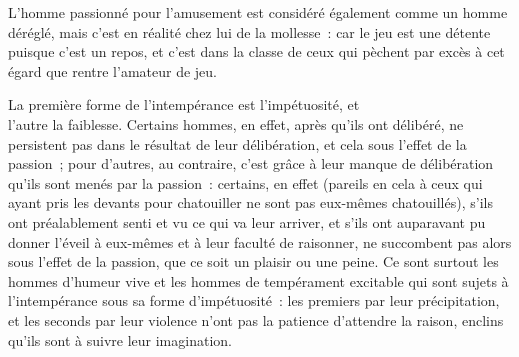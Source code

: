 \documentclass[french,twoside]{book} %
\begin{document}
L’homme passionné pour l’amusement est considéré également comme un homme déréglé, mais c’est en réalité chez lui de la mollesse : car le jeu est une détente puisque c’est un repos, et c’est dans la classe de ceux qui pèchent par excès à cet égard que rentre l’amateur de jeu.\par
La première forme de l’intempérance est l’impétuosité, et \\
l’autre la faiblesse. Certains hommes, en effet, après qu’ils ont délibéré, ne persistent pas dans le résultat de leur délibération, et cela sous l’effet de la passion ; pour d’autres, au contraire, c’est grâce à leur manque de délibération qu’ils sont menés par la passion : certains, en effet (pareils en cela à ceux qui ayant pris les devants pour chatouiller ne sont pas eux-mêmes chatouillés), s’ils ont préalablement senti et vu ce qui va leur arriver, et s’ils ont auparavant pu donner l’éveil à eux-mêmes et à leur faculté de raisonner, ne succombent pas alors \\
sous l’effet de la passion, que ce soit un plaisir ou une peine. Ce sont surtout les hommes d’humeur vive et les hommes de tempérament excitable qui sont sujets à l’intempérance sous sa forme d’impétuosité : les premiers par leur précipitation, et les seconds par leur violence n’ont pas la patience d’attendre la raison, enclins qu’ils sont à suivre leur imagination.
\end{document}
